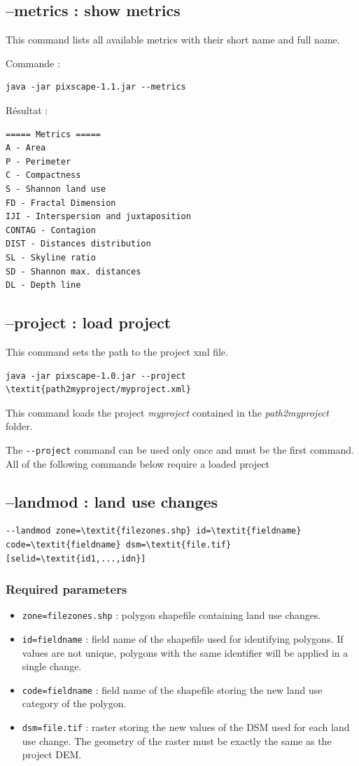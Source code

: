 \documentclass{report}
\begin{document}
\subsection{--metrics : show metrics}
This command lists all available metrics with their short name and full name.

Commande :
\begin{Verbatim}
java -jar pixscape-1.1.jar --metrics
\end{Verbatim}
Résultat :
\begin{Verbatim}
===== Metrics =====
A - Area
P - Perimeter
C - Compactness
S - Shannon land use
FD - Fractal Dimension
IJI - Interspersion and juxtaposition
CONTAG - Contagion
DIST - Distances distribution
SL - Skyline ratio
SD - Shannon max. distances
DL - Depth line
\end{Verbatim}

\subsection{--project : load project}
This command sets the path to the project xml file.
\begin{Verbatim}[commandchars=\\\{\}]
java -jar pixscape-1.0.jar --project \textit{path2myproject/myproject.xml}
\end{Verbatim}
This command loads the project \textit{myproject} contained in the \textit{path2myproject} folder.

The \verb|--project| command can be used only once and must be the first command.  All of the following commands below require a loaded project

\subsection{--landmod : land use changes}

\begin{Verbatim}[commandchars=\\\{\}]
--landmod zone=\textit{filezones.shp} id=\textit{fieldname} code=\textit{fieldname} dsm=\textit{file.tif} [selid=\textit{id1,...,idn}]
\end{Verbatim}

\subsubsection{Required parameters}
\begin{itemize}
	\item \verb|zone=filezones.shp| : polygon shapefile containing land use changes.
	\item \verb|id=fieldname| : field name of the shapefile used for identifying polygons. If values are not unique, polygons with the same identifier will be applied in a single change.
	\item \verb|code=fieldname| : field name of the shapefile storing the new land use category of the polygon.
	\item \verb|dsm=file.tif| : raster storing the new values of the DSM used for each land use change. The geometry of the raster must be exactly the same as the project DEM.
\end{itemize}
\end{document}
